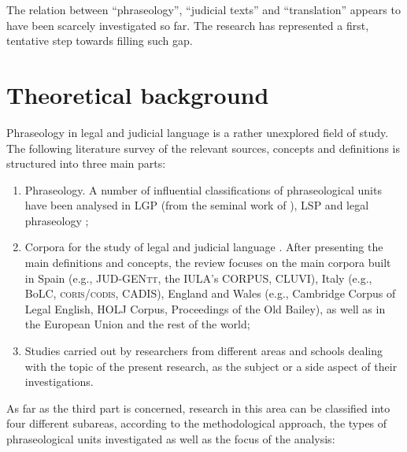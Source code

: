 \documentclass[output=paper]{LSP/langsci}
\begin{document}
The relation between “phraseology”, “judicial texts” and “translation” appears to have been scarcely investigated so far. The research has represented a first, tentative step towards filling such gap.

\section{Theoretical background}
Phraseology in legal and judicial language is a rather unexplored field of study. The following literature survey of the relevant sources, concepts and definitions is structured into three main parts:

\begin{enumerate}
\item Phraseology. A number of influential classifications of phraseological units have been analysed in LGP (from the seminal work of \citealt{Benson1986,Corpas1996,Gläser1994/1995,Glaeser1998,Ruiz1997,Cowie1988,Cowie2001,Melchuk1998, Moon1998,Burger1998,Granger2008}), LSP  \citep{Homme2000,Lorente2001,Tercedor1999,Montero2002,Bevilacqua2004,Aguado2007} and legal phraseology \citep {Kjær1990,Kjaer1990b};
\item Corpora for the study of legal and judicial language \citep[see][]{Pontrandolfo2012}. After presenting the main definitions and concepts, the review focuses on the main corpora built in Spain (e.g., JUD-GEN\textsc{tt}, the IULA’s CORPUS, CLUVI), Italy (e.g., BoLC, \textsc{coris}/\textsc{codis}, CADIS), England and Wales (e.g., Cambridge Corpus of Legal English, HOLJ Corpus, Proceedings of the Old Bailey), as well as in the European Union and the rest of the world;
\item Studies carried out by researchers from different areas and schools dealing with the topic of the present research, as the subject or a side aspect of their investigations.
\end{enumerate}

As far as the third part is concerned, research in this area can be classified into four different subareas, according to the methodological approach, the types of phraseological units investigated as well as the focus of the analysis:
\end{document}
